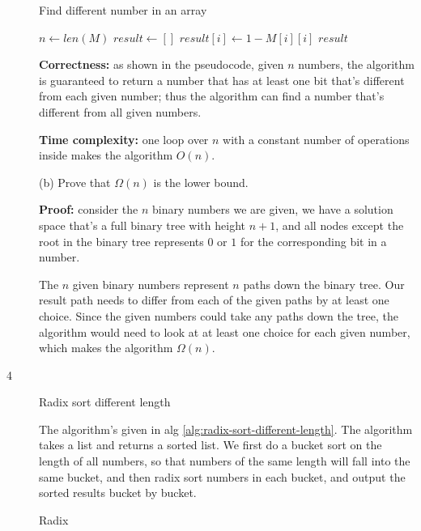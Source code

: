 \documentclass{article}
\begin{document}
\begin{description}
  \begin{algorithm}[H]
  \caption{Find different number in an array}
  \label{alg:find-different-binary-number}
    \begin{algorithmic}[1]
    
      \State $n \gets len(M)$
      \State $result \gets []$
        \State $result[i] \gets 1 - M[i][i]$
      \EndFor
      \State \Return $result$
    \EndFunction

    \end{algorithmic}
  \end{algorithm}

  \textbf{Correctness:} as shown in the pseudocode, given $n$ numbers, the algorithm is guaranteed to return a number that has at least one bit that's different from each given number; thus the algorithm can find a number that's different from all given numbers.

  \textbf{Time complexity:} one loop over $n$ with a constant number of operations inside makes the algorithm $O(n)$.

  (b) Prove that $\Omega(n)$ is the lower bound.

  \textbf{Proof:} consider the $n$ binary numbers we are given, we have a solution space that's a full binary tree with height $n + 1$, and all nodes except the root in the binary tree represents $0$ or $1$ for the corresponding bit in a number. 

  The $n$ given binary numbers represent $n$ paths down the binary tree. Our result path needs to differ from each of the given paths by at least one choice. Since the given numbers could take any paths down the tree, the algorithm would need to look at at least one choice for each given number, which makes the algorithm $\Omega(n)$. 

\item[4]{Radix sort different length}

  The algorithm's given in alg \ref{alg:radix-sort-different-length}. The algorithm takes a list and returns a sorted list. We first do a bucket sort on the length of all numbers, so that numbers of the same length will fall into the same bucket, and then radix sort numbers in each bucket, and output the sorted results bucket by bucket.

  \begin{algorithm}[H]
  \caption{Radix}
  \label{alg:radix-sort-different-length}
    \begin{algorithmic}[1]
    

\end{algorithmic}
\end{algorithm}
\end{description}
\end{document}

